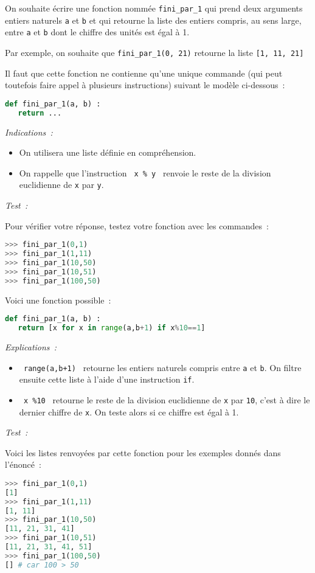 
%
On souhaite écrire une fonction nommée \texttt{fini_par_1} qui prend deux arguments entiers naturels \texttt{a} et \texttt{b} et qui retourne la liste des entiers compris, au sens large, entre \texttt{a} et \texttt{b} dont le chiffre des unités est égal à 1.
\par
Par exemple, on souhaite que \texttt{fini_par_1(0, 21)} retourne la liste \texttt{[1, 11, 21]}
\par
Il faut que cette fonction ne contienne qu'une unique commande (qui peut toutefois faire appel à plusieurs instructions) suivant le modèle ci-dessous~:
\begin{lstlisting}[language=Python]
def fini_par_1(a, b) :
   return ...
\end{lstlisting}
\medskip
\textit{Indications~: }
\begin{itemize}
     \item
     On utilisera une liste définie en compréhension.
     \item
     On rappelle que l'instruction \texttt{ x \% y } renvoie le reste de la division euclidienne de \texttt{x} par \texttt{y}.
\end{itemize}
\medskip
\textit{Test~: }
\par
Pour vérifier votre réponse, testez votre fonction avec les commandes~:
\begin{lstlisting}[language=Python]
>>> fini_par_1(0,1)
>>> fini_par_1(1,11)
>>> fini_par_1(10,50)
>>> fini_par_1(10,51)
>>> fini_par_1(100,50)
\end{lstlisting}
\begin{corrige}
     Voici une fonction possible~:
     \par
\begin{lstlisting}[language=Python]
def fini_par_1(a, b) :
   return [x for x in range(a,b+1) if x%10==1]
\end{lstlisting}
\medskip
\textit{Explications~: }
\begin{itemize}
     \item
     \texttt{ range(a,b+1) } retourne les entiers naturels compris entre \texttt{a} et \texttt{b}. On filtre ensuite cette liste à l'aide d'une instruction \texttt{if}.
     \item
     \texttt{ x \%10 } retourne le reste de la division euclidienne de \texttt{x} par \texttt{10}, c'est à dire le dernier chiffre de \texttt{x}. On teste alors si ce chiffre est égal à 1.
\end{itemize}
\medskip
\textit{Test~: }
\par
Voici les listes renvoyées par cette fonction pour les exemples donnés dans l'énoncé~:
\begin{lstlisting}[language=Python]
>>> fini_par_1(0,1)
[1]
>>> fini_par_1(1,11)
[1, 11]
>>> fini_par_1(10,50)
[11, 21, 31, 41]
>>> fini_par_1(10,51)
[11, 21, 31, 41, 51]
>>> fini_par_1(100,50)
[] # car 100 > 50
\end{lstlisting}
\end{corrige}
